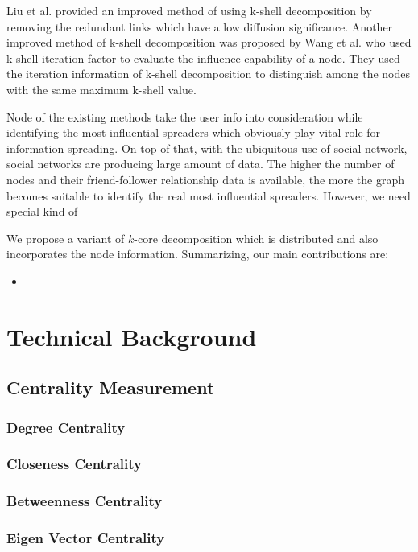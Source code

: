 \documentclass[sigconf]{acmart}
\begin{document}
Liu et al. \cite{liu2015improving} provided an improved method of using k-shell decomposition by removing the redundant links which have a low diffusion significance. Another improved method of k-shell decomposition was proposed by Wang et al.\cite{wang2016fast} who used k-shell iteration factor to evaluate the influence capability of a node. They used the iteration information of k-shell decomposition to distinguish among the nodes with the same maximum k-shell value.

Node of the existing methods take the user info into consideration while identifying the most influential spreaders which obviously play vital role for information spreading. On top of that, with the ubiquitous use of social network, social networks are producing large amount of data. The higher the number of nodes and their friend-follower relationship data is available, the more the graph becomes suitable to identify the real most influential spreaders. However, we need special kind of 


We propose a variant of $k$-core decomposition which is distributed and also incorporates the node information. Summarizing, our main contributions are:

\begin{itemize}
	\item  
\end{itemize} 

\section{Technical Background}


\subsection{Centrality Measurement}
\subsubsection{Degree Centrality}


\subsubsection{Closeness Centrality}

\subsubsection{Betweenness Centrality}

\subsubsection{Eigen Vector Centrality}
\end{document}
